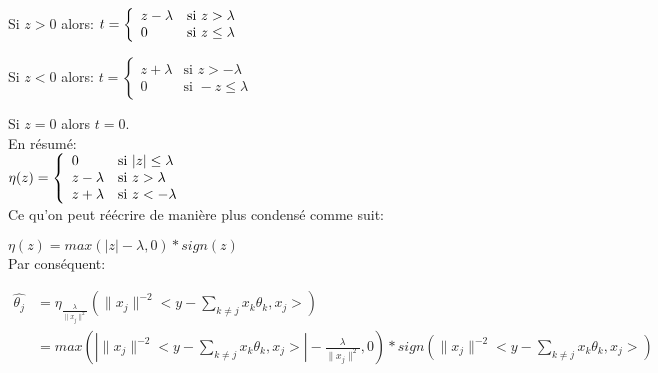 \documentclass{article}
\begin{document}
Si $z > 0$ alors: 
$t = \left\{
    \begin{array}{lll}
         z - \lambda & \mbox{si } z > \lambda \\
         0 & \mbox{si }  z \leq \lambda 
    \end{array}
\right. \\ $
\vspace{0.5cm}

Si $z < 0$ alors: 
$t = \left\{
    \begin{array}{lll}
         z + \lambda & \mbox{si } z > - \lambda \\
         0 & \mbox{si }  -z \leq \lambda 
    \end{array}
\right.$
\vspace{0.5cm}

Si $z = 0$ alors $t = 0$.\\

En résumé:\\
 
$\eta(z) = \left\{
    \begin{array}{lll}
         0 & \mbox{si } |z| \leq \lambda \\
         z - \lambda & \mbox{si } z > \lambda \\
         z + \lambda & \mbox{si } z < - \lambda 
    \end{array}
\right. \\ $ \\

Ce qu'on peut réécrire de manière plus condensé comme suit:

$\eta(z) = max(|z| - \lambda,0)*sign(z)$
\\


Par conséquent:
 
\begin{align*}
\hat{\theta_j} &= \eta_\frac{\lambda}{\|x_j\|^2}( \|x_j\|^{-2}<y - \sum_{k \ne j} x_k\theta_k,x_j>) \\
&=  max(|\|x_j\|^{-2}<y - \sum_{k \ne j} x_k\theta_k,x_j>| -\frac{\lambda}{\|x_j\|^2},0)*sign(\|x_j\|^{-2}<y - \sum_{k \ne j} x_k\theta_k,x_j>)
\end{align*}
\end{document}
